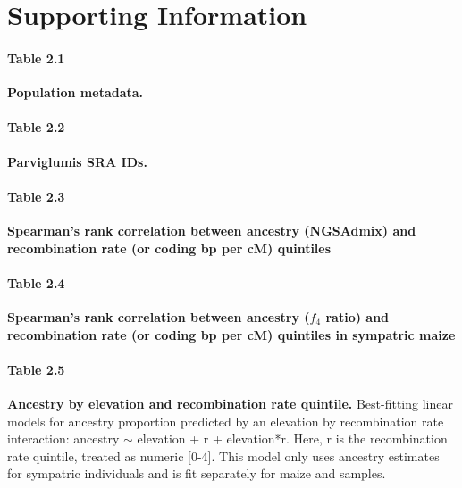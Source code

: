 \medskip

%


%

\newpage
\section*{Supporting Information}


\paragraph*{Table 2.1}
\label{population_metadata}
{\bf Population metadata.} 

\paragraph*{Table 2.2}
\label{parv50}
{\bf Parviglumis SRA IDs.} 

\paragraph*{Table 2.3}
\label{spearmans_rho_ngsadmix}
{\bf Spearman's rank correlation between \mexicana ancestry (NGSAdmix) and recombination rate (or coding bp per cM) quintiles}


\paragraph*{Table 2.4}
\label{spearmans_rho_f4_sympatric_maize_pop22}
{\bf Spearman's rank correlation between ancestry ($f_4$ ratio) and recombination rate (or coding bp per cM) quintiles in sympatric maize}


\paragraph*{Table 2.5}
\label{tbl_elev_r_interaction_5}
{\bf Ancestry by elevation and recombination rate quintile.} Best-fitting linear models for ancestry proportion predicted by an elevation by recombination rate interaction: \mexicana ancestry $\sim$ elevation + r + elevation*r. Here, r is the recombination rate quintile, treated as numeric [0-4]. This model only uses ancestry estimates for sympatric individuals and is fit separately for maize and \mexicana samples.



